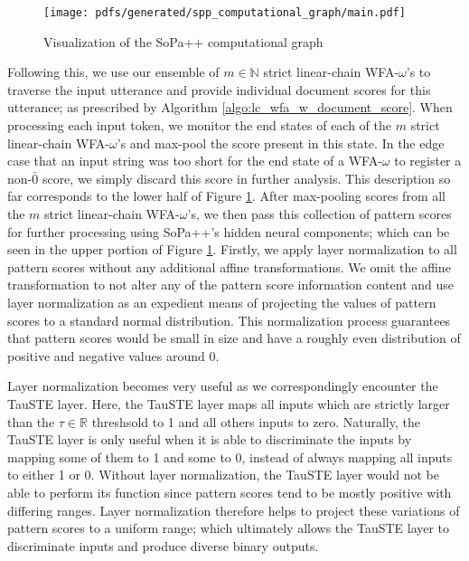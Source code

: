 \begin{figure}[t!]
  \centering
  \texttt{[image: pdfs/generated/spp\_computational\_graph/main.pdf]}
  \caption{Visualization of the SoPa++ computational graph}
  \label{fig:spp_cg}
\end{figure}

Following this, we use our ensemble of $m \in \mathbb{N}$ strict linear-chain
WFA-$\omega$'s to traverse the input utterance and provide individual document
scores for this utterance; as prescribed by Algorithm
\ref{algo:lc_wfa_w_document_score}. When processing each input token, we monitor
the end states of each of the $m$ strict linear-chain WFA-$\omega$'s and
max-pool the score present in this state. In the edge case that an input string
was too short for the end state of a WFA-$\omega$ to register a non-$\bar{0}$
score, we simply discard this score in further analysis. This description so far
corresponds to the lower half of Figure \ref{fig:spp_cg}. After max-pooling
scores from all the $m$ strict linear-chain WFA-$\omega$'s, we then pass this
collection of pattern scores for further processing using SoPa++'s hidden neural
components; which can be seen in the upper portion of Figure \ref{fig:spp_cg}.
Firstly, we apply layer normalization \citep{ba2016layer} to all pattern scores
without any additional affine transformations. We omit the affine transformation
to not alter any of the pattern score information content and use layer
normalization as an expedient means of projecting the values of pattern scores
to a standard normal distribution. This normalization process guarantees that
pattern scores would be small in size and have a roughly even distribution of
positive and negative values around 0.

Layer normalization becomes very useful as we correspondingly encounter the
TauSTE layer. Here, the TauSTE layer maps all inputs which are strictly larger
than the $\tau \in \mathbb{R}$ threshsold to 1 and all others inputs to zero.
Naturally, the TauSTE layer is only useful when it is able to discriminate the
inputs by mapping some of them to 1 and some to 0, instead of always mapping all
inputs to either 1 or 0. Without layer normalization, the TauSTE layer would not
be able to perform its function since pattern scores tend to be mostly positive
with differing ranges. Layer normalization therefore helps to project these
variations of pattern scores to a uniform range; which ultimately allows the TauSTE
layer to discriminate inputs and produce diverse binary outputs.

